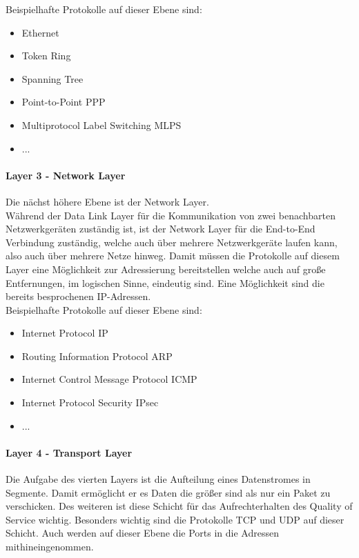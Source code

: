 \documentclass[11pt,a4paper]{report}
\begin{document}
Beispielhafte Protokolle auf dieser Ebene sind:
\begin{itemize}
\item Ethernet
\item Token Ring
\item Spanning Tree 
\item Point-to-Point PPP
\item Multiprotocol Label Switching MLPS
\item ...
\end{itemize}
\paragraph{Layer 3 - Network Layer}
Die nächst höhere Ebene ist der Network Layer.\\
Während der Data Link Layer für die Kommunikation von zwei benachbarten Netzwerkgeräten zuständig ist, ist der Network Layer für die End-to-End Verbindung zuständig, welche auch über mehrere Netzwerkgeräte laufen kann, also auch über mehrere Netze hinweg. Damit müssen die Protokolle auf diesem Layer eine Möglichkeit zur Adressierung bereitstellen welche auch auf große Entfernungen, im logischen Sinne, eindeutig sind. Eine Möglichkeit sind die bereits besprochenen IP-Adressen.\\

Beispielhafte Protokolle auf dieser Ebene sind:
\begin{itemize}
\item Internet Protocol IP
\item Routing Information Protocol ARP
\item Internet Control Message Protocol ICMP
\item Internet Protocol Security IPsec
\item ...
\end{itemize}

\paragraph{Layer 4 - Transport Layer}
Die Aufgabe des vierten Layers ist die Aufteilung eines Datenstromes in Segmente. Damit ermöglicht er es Daten die größer sind als nur ein Paket zu verschicken. Des weiteren ist diese Schicht für das Aufrechterhalten des Quality of Service wichtig. Besonders wichtig sind die Protokolle TCP und UDP auf dieser Schicht. Auch werden auf dieser Ebene die Ports in die Adressen mithineingenommen.\\
\end{document}
